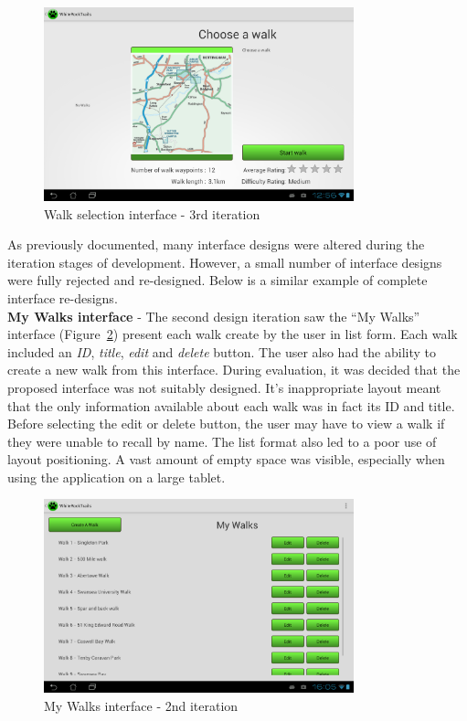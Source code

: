 \documentclass[11pt,a4paper]{report}
\begin{document}
\begin{figure}[H]
    \centering
    \includegraphics[width=0.8\textwidth]{chris/final_choose_walk}
    \caption{Walk selection interface - 3rd iteration }
    \label{fig:choose_walk3}
\end{figure}


As previously documented, many interface designs were altered during the iteration stages of development. However, a small number of interface designs were fully rejected and re-designed. Below is a similar example of complete interface re-designs.\\

\textbf{My Walks interface} - The second design iteration saw the ``My Walks'' interface (Figure~\ref{fig:app_my_walks_view1}) present each walk create by the user in list form. Each walk included an \emph{ID}, \emph{title}, \emph{edit} and \emph{delete} button. The user also had the ability to create a new walk from this interface. During evaluation, it was decided that the proposed interface was not suitably designed. It's inappropriate layout meant that the only information available about each walk was in fact its ID and title. Before selecting the edit or delete button, the user may have to view a walk if they were unable to recall by name. The list format also led to a poor use of layout positioning. A vast amount of empty space was visible, especially when using the application on a large tablet.

\begin{figure}[H]
    \centering
    \includegraphics[width=0.8\textwidth]{chris/app_my_walks_view}
    \caption{My Walks interface - 2nd iteration}
    \label{fig:app_my_walks_view1}
\end{figure}
\end{document}
